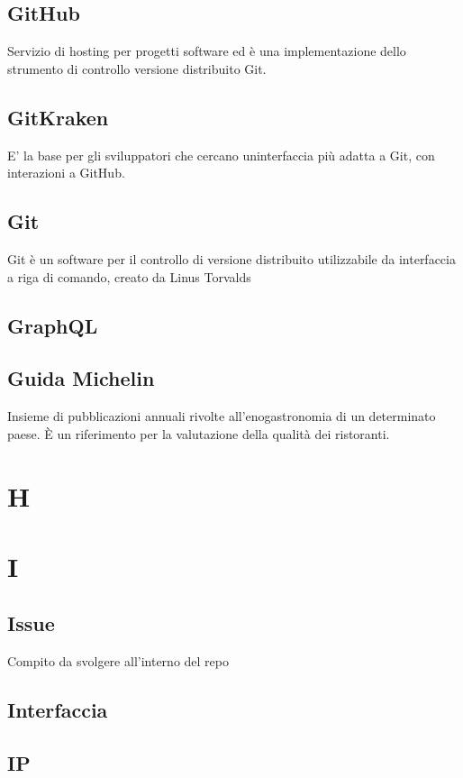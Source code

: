 \documentclass{classes/base}
\begin{document}
        \subsection*{GitHub}
        Servizio di hosting per progetti software ed è una implementazione dello strumento di controllo versione distribuito Git.

        \subsection*{GitKraken}
        E' la base per gli sviluppatori che cercano uninterfaccia più adatta a Git, con interazioni a GitHub. 

        \subsection*{Git}
        Git è un software per il controllo di versione distribuito utilizzabile da interfaccia a riga di comando, creato da Linus Torvalds

        \subsection*{GraphQL}

        \subsection*{Guida Michelin} Insieme di pubblicazioni annuali rivolte all’enogastronomia di un determinato paese. È un riferimento per la valutazione della qualità dei ristoranti.
        \newpage  
    \section*{H}
    \newpage  
    \section*{I}
        \subsection*{Issue}
        Compito da svolgere all'interno del repo

        \subsection*{Interfaccia}
        
        \subsection*{IP}
        \newpage  
\end{document}
